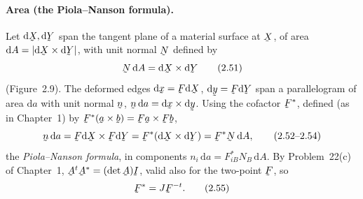 \documentclass[17pt,a4paper]{extreport}
\DeclareRobustCommand{\vek}[1]{\underaccent{\tilde}{#1}}
\newcommand{\I}{\vek{I}}
\newcommand{\ba}{\vek{a}}
\newcommand{\bb}{\vek{b}}
\newcommand{\bx}{\vek{x}}
\newcommand{\by}{\vek{y}}
\newcommand{\bX}{\vek{X}}
\newcommand{\bY}{\vek{Y}}
\newcommand{\bn}{\vek{n}}
\newcommand{\bN}{\vek{N}}
\newcommand{\bA}{\vek{A}}
\newcommand{\bF}{\vek{F}}
\newcommand{\dl}{\mathrm{d}}
\theoremstyle{scplain}
\theoremstyle{scdefn}
\begin{document}
\paragraph*{Area (the Piola--Nanson formula).}
Let $\dl\bX,\dl\bY$ span the tangent plane of a material surface at $\bX$,
of area $\dl A=|\dl\bX\times\dl\bY|$, with unit normal $\bN$ defined by
\begin{equation}
   \bN\,\dl A=\dl\bX\times\dl\bY \tag{2.51}\label{eq:2.51}
\end{equation}
(Figure~2.9). The deformed edges $\dl\bx=\bF\dl\bX$, $\dl\by=\bF\dl\bY$ span
a parallelogram of area $\dl a$ with unit normal $\bn$, $\bn\,\dl a=\dl\bx
\times\dl\by$. Using the cofactor $\bF^{*}$, defined (as in Chapter~1) by
$\bF^{*}(\ba\times\bb)=\bF\ba\times\bF\bb$,
\begin{equation}
   \bn\,\dl a=\bF\dl\bX\times\bF\dl\bY=\bF^{*}(\dl\bX\times\dl\bY)
   =\bF^{*}\bN\,\dl A, \tag{2.52--2.54}\label{eq:2.52}
\end{equation}
the \emph{Piola--Nanson formula}, in components $n_i\,\dl a=F^{*}_{iB}N_B\,\dl A$.
By Problem~22(c) of Chapter~1, $\bA^{t}\bA^{*}=(\det\bA)\I$, valid also for
the two-point $\bF$, so
\begin{equation}
   \bF^{*}=J\bF^{-t}. \tag{2.55}\label{eq:2.55}
\end{equation}
\end{document}
